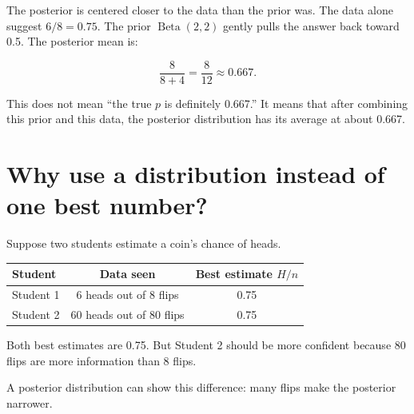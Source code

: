 \documentclass[11pt]{article}
\begin{document}
The posterior is centered closer to the data than the prior was. The data alone suggest $6/8=0.75$. The prior $\operatorname{Beta}(2,2)$ gently pulls the answer back toward 0.5. The posterior mean is:

\[
\frac{8}{8+4}=\frac{8}{12}\approx 0.667.
\]

This does not mean ``the true $p$ is definitely 0.667.'' It means that after combining this prior and this data, the posterior distribution has its average at about 0.667.

\section{Why use a distribution instead of one best number?}

Suppose two students estimate a coin's chance of heads.

\begin{center}
\begin{tabular}{lcc}
\toprule
Student & Data seen & Best estimate $H/n$ \\
\midrule
Student 1 & 6 heads out of 8 flips & 0.75 \\
Student 2 & 60 heads out of 80 flips & 0.75 \\
\bottomrule
\end{tabular}
\end{center}

Both best estimates are 0.75. But Student 2 should be more confident because 80 flips are more information than 8 flips.

A posterior distribution can show this difference: many flips make the posterior narrower.

\begin{center}
\end{center}
\end{document}

